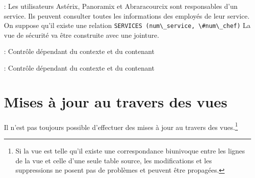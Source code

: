 \documentclass[10pt]{beamer}
\begin{document}
\begin{frame}{\secname : \subsecname}
    Les utilisateurs Astérix,  Panoramix et Abraracourcix sont responsables d'un service. Ils peuvent consulter toutes les informations des employés de leur service.
    On suppose qu'il existe une relation
    \lstinline[language=sql]!SERVICES (num\_service, \#num\_chef)!
    La vue de sécurité va être construite avec une jointure.
\end{frame}

\begin{frame}{\secname : \subsecname}
    Contrôle dépendant du contexte et du contenant
    
\end{frame}

\begin{frame}{\secname : \subsecname}
    Contrôle dépendant du contexte et du contenant
    
\end{frame}

\section{Mises à jour au travers des vues}
\begin{frame}{\secname}
    Il n'est pas toujours possible d'effectuer des mises à jour au travers des vues.\footnote{Si la vue est telle qu'il existe une correspondance biunivoque entre les lignes de la vue et celle d'une seule table source, les modifications et les suppressions ne posent pas de problèmes et peuvent être propagées.
    }
\end{frame}
\end{document}

